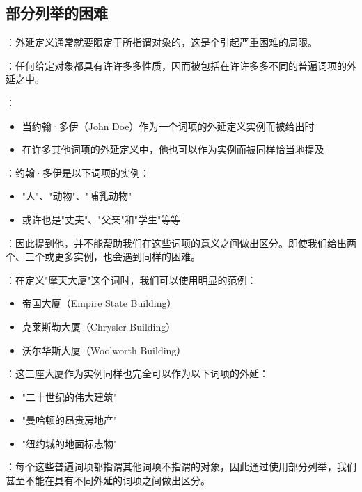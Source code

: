 \subsection{部分列举的困难}

\begin{theorembox}[title=局限三：部分列举的严重困难]
：外延定义通常就要限定于所指谓对象的，这是个引起严重困难的局限。

：任何给定对象都具有许许多多性质，因而被包括在许许多多不同的普遍词项的外延之中。
\end{theorembox}

\begin{examplebox}[title=约翰·多伊的多重身份问题]
：
\begin{itemize}
  \item 当约翰·多伊（John Doe）作为一个词项的外延定义实例而被给出时
  \item 在许多其他词项的外延定义中，他也可以作为实例而被同样恰当地提及
\end{itemize}

：约翰·多伊是以下词项的实例：
\begin{itemize}
  \item "人"、"动物"、"哺乳动物"
  \item 或许也是"丈夫"、"父亲"和"学生"等等
\end{itemize}

：因此提到他，并不能帮助我们在这些词项的意义之间做出区分。即使我们给出两个、三个或更多实例，也会遇到同样的困难。
\end{examplebox}

\begin{examplebox}[title=摩天大厦定义的歧义问题]
：在定义"摩天大厦"这个词时，我们可以使用明显的范例：
\begin{itemize}
  \item 帝国大厦（Empire State Building）
  \item 克莱斯勒大厦（Chrysler Building）
  \item 沃尔华斯大厦（Woolworth Building）
\end{itemize}

：这三座大厦作为实例同样也完全可以作为以下词项的外延：
\begin{itemize}
  \item "二十世纪的伟大建筑"
  \item "曼哈顿的昂贵房地产"
  \item "纽约城的地面标志物"
\end{itemize}

：每个这些普遍词项都指谓其他词项不指谓的对象，因此通过使用部分列举，我们甚至不能在具有不同外延的词项之间做出区分。
\end{examplebox}

